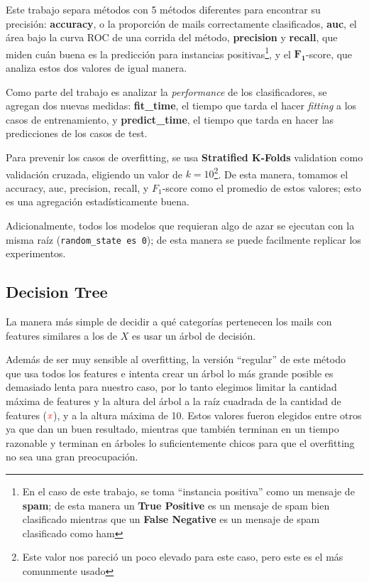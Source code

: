 \documentclass{article}
\newcommand{\todox}{\(\mathit{\color{red}x}\)}
\newcommand{\fo}{\(\mathbf{F_1}\)}
\begin{document}
Este trabajo separa métodos con 5 métodos diferentes para encontrar su precisión: \textbf{accuracy}, o la proporción de mails correctamente clasificados, \textbf{auc}, el área bajo la curva ROC de una corrida del método, \textbf{precision} y \textbf{recall}, que miden cuán buena es la predicción para instancias positivas\footnote{En el caso de este trabajo, se toma ``instancia positiva'' como un mensaje de \textbf{spam}; de esta manera un \textbf{True Positive} es un mensaje de spam bien clasificado mientras que un \textbf{False Negative} es un mensaje de spam clasificado como ham}, y el \fo-score, que analiza estos dos valores de igual manera.

Como parte del trabajo es analizar la \textit{performance} de los clasificadores, se agregan dos nuevas medidas: \textbf{fit\_time}, el tiempo que tarda el hacer \textit{fitting} a los casos de entrenamiento, y \textbf{predict\_time}, el tiempo que tarda en hacer las predicciones de los casos de test.

Para prevenir los casos de overfitting, se usa \textbf{Stratified K-Folds} validation como validación cruzada, eligiendo un valor de \( k = 10 \)\footnote{Este valor nos pareció un poco elevado para este caso, pero este es el más comunmente usado}. De esta manera, tomamos el accuracy, auc, precision, recall, y \(F_1\)-score como el promedio de estos valores; esto es una agregación estadísticamente buena\cite{forman2010}.

Adicionalmente, todos los modelos que requieran algo de azar se ejecutan con la misma raíz (\texttt{random\_state es 0}); de esta manera se puede facilmente replicar los experimentos.

\subsection{Decision Tree}

La manera más simple de decidir a qué categorías pertenecen los mails con features similares a los de \( X \) es usar un árbol de decisión.

Además de ser muy sensible al overfitting, la versión ``regular'' de este método que usa todos los features e intenta crear un árbol lo más grande posible es demasiado lenta para nuestro caso, por lo tanto elegimos limitar la cantidad máxima de features y la altura del árbol a la raíz cuadrada de la cantidad de features (\todox{}), y a la altura máxima de 10. Estos valores fueron elegidos entre otros ya que dan un buen resultado, mientras que también terminan en un tiempo razonable y terminan en árboles lo suficientemente chicos para que el overfitting no sea una gran preocupación.
\end{document}

